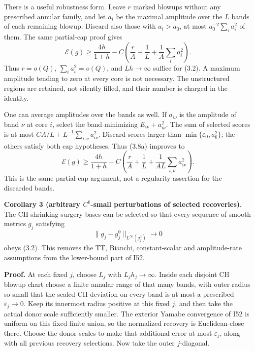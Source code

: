 \documentclass[
  10pt,
]{article}
\begin{document}
There is a useful robustness form. Leave \(r\) marked blowups without
any prescribed annular family, and let \(a_i\) be the maximal amplitude
over the \(L\) bands of each remaining blowup. Discard also those with
\(a_i>a_0\), at most \(a_0^{-2}\sum_i a_i^2\) of them. The same
partial-cap proof gives \[
 \mathcal E(g)\ge\frac{4h}{1+h}
       -C\left(\frac rA+\frac1L+\frac1A\sum_i a_i^2\right).
                                                               \tag{3.8a}
\] Thus \(r=o(Q)\), \(\sum_i a_i^2=o(Q)\), and \(Lh\to\infty\) suffice
for (3.2). A maximum amplitude tending to zero at every core is not
necessary. The unstructured regions are retained, not silently filled,
and their number is charged in the identity.

One can average amplitudes over the bands as well. If \(a_{i\nu}\) is
the amplitude of band \(\nu\) at core \(i\), select the band minimizing
\(E_{i\nu}+a_{i\nu}^2\). The sum of selected scores is at most
\(CA/L+L^{-1}\sum_{i,\nu}a_{i\nu}^2\). Discard scores larger than
\(\min\{\varepsilon_0,a_0^2\}\); the others satisfy both cap hypotheses.
Thus (3.8a) improves to \[
 \mathcal E(g)\ge\frac{4h}{1+h}
       -C\left(\frac rA+\frac1L+
                      \frac1{AL}\sum_{i,\nu}a_{i\nu}^2\right).
                                                               \tag{3.8b}
\] This is the same partial-cap argument, not a regularity assertion for
the discarded bands.

\textbf{Corollary 3 (arbitrary \(C^0\)-small perturbations of selected
recoveries).} The CH shrinking-surgery bases can be selected so that
every sequence of smooth metrics \(g_j\) satisfying \[
                   \|g_j-g_j^0\|_{L^\infty(g_j^0)}\to0
\] obeys (3.2). This removes the TT, Bianchi, constant-scalar and
amplitude-rate assumptions from the lower-bound part of I52.

\textbf{Proof.} At each fixed \(j\), choose \(L_j\) with
\(L_jh_j\to\infty\). Inside each disjoint CH blowup chart choose a
finite annular range of that many bands, with outer radius so small that
the scaled CH deviation on every band is at most a prescribed
\(\varepsilon_j\to0\). Keep its innermost radius positive at this fixed
\(j\), and then take the actual donor scale sufficiently smaller. The
exterior Yamabe convergence of I52 is uniform on this fixed finite
union, so the normalized recovery is Euclidean-close there. Choose the
donor scales to make that additional error at most \(\varepsilon_j\),
along with all previous recovery selections. Now take the outer
\(j\)-diagonal.
\end{document}
